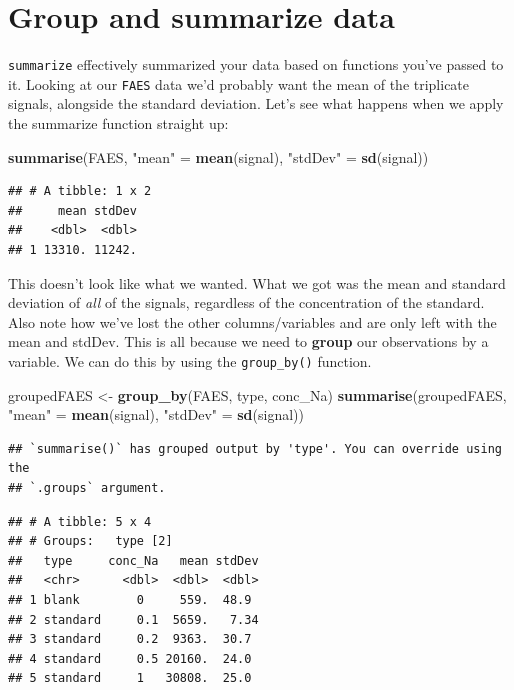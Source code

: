 \documentclass[
]{book}
\newenvironment{Shaded}{\begin{snugshade}}{\end{snugshade}}
\newcommand{\FunctionTok}[1]{\textcolor[rgb]{0.13,0.29,0.53}{\textbf{#1}}}
\newcommand{\NormalTok}[1]{#1}
\newcommand{\OtherTok}[1]{\textcolor[rgb]{0.56,0.35,0.01}{#1}}
\newcommand{\StringTok}[1]{\textcolor[rgb]{0.31,0.60,0.02}{#1}}
\begin{document}
\hypertarget{group-and-summarize-data}{%
\section{Group and summarize data}\label{group-and-summarize-data}}

\texttt{summarize} effectively summarized your data based on functions you've passed to it. Looking at our \texttt{FAES} data we'd probably want the mean of the triplicate signals, alongside the standard deviation. Let's see what happens when we apply the summarize function straight up:

\begin{Shaded}
\begin{Highlighting}[]
\FunctionTok{summarise}\NormalTok{(FAES, }\StringTok{"mean"} \OtherTok{=} \FunctionTok{mean}\NormalTok{(signal), }\StringTok{"stdDev"} \OtherTok{=} \FunctionTok{sd}\NormalTok{(signal))}
\end{Highlighting}
\end{Shaded}

\begin{verbatim}
## # A tibble: 1 x 2
##     mean stdDev
##    <dbl>  <dbl>
## 1 13310. 11242.
\end{verbatim}

This doesn't look like what we wanted. What we got was the mean and standard deviation of \emph{all} of the signals, regardless of the concentration of the standard. Also note how we've lost the other columns/variables and are only left with the mean and stdDev. This is all because we need to \textbf{group} our observations by a variable. We can do this by using the \texttt{group\_by()} function.

\begin{Shaded}
\begin{Highlighting}[]
\NormalTok{groupedFAES }\OtherTok{\textless{}{-}} \FunctionTok{group\_by}\NormalTok{(FAES, type, conc\_Na)}
\FunctionTok{summarise}\NormalTok{(groupedFAES, }\StringTok{"mean"} \OtherTok{=} \FunctionTok{mean}\NormalTok{(signal), }\StringTok{"stdDev"} \OtherTok{=} \FunctionTok{sd}\NormalTok{(signal))}
\end{Highlighting}
\end{Shaded}

\begin{verbatim}
## `summarise()` has grouped output by 'type'. You can override using the
## `.groups` argument.
\end{verbatim}

\begin{verbatim}
## # A tibble: 5 x 4
## # Groups:   type [2]
##   type     conc_Na   mean stdDev
##   <chr>      <dbl>  <dbl>  <dbl>
## 1 blank        0     559.  48.9 
## 2 standard     0.1  5659.   7.34
## 3 standard     0.2  9363.  30.7 
## 4 standard     0.5 20160.  24.0 
## 5 standard     1   30808.  25.0
\end{verbatim}
\end{document}
